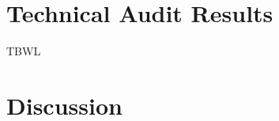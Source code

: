 \documentclass[conference,compsoc]{IEEEtran}
\begin{document}
\section{Technical Audit Results}
\label{sec:audit-results}
TBWL

\section{Discussion}
\label{sec:discussion}
\end{document}
